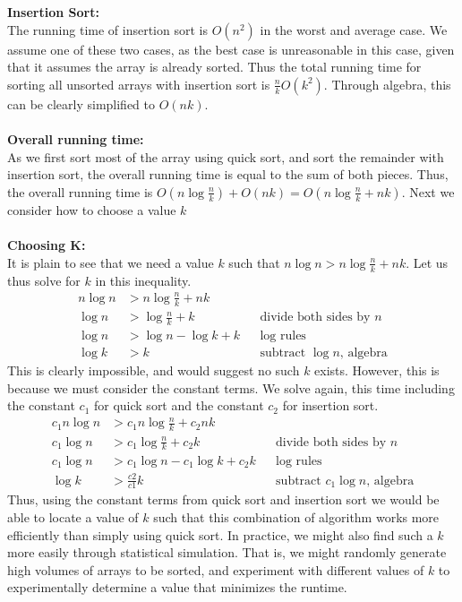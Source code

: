 \documentclass{article}
\begin{document}
\begin{enumerate}
	\\ \\ \textbf{Insertion Sort:}
	\\ The running time of insertion sort is $O(n^2)$ in the worst and average case. We assume one of these two cases, as the best case is unreasonable in this case, given that it assumes the array is already sorted. Thus the total running time for sorting all unsorted arrays with insertion sort is $\frac{n}{k}O(k^2)$. Through algebra, this can be clearly simplified to $O(nk)$.
	\\ \\ \textbf{Overall running time:}
	\\ As we first sort most of the array using quick sort, and sort the remainder with insertion sort, the overall running time is equal to the sum of both pieces. Thus, the overall running time is $O(n\log \frac{n}{k}) + O(nk)= O(n\log \frac{n}{k} + nk)$. Next we consider how to choose a value $k$
	\\ \\ \textbf{Choosing K:}
	\\ It is plain to see that we need a value $k$ such that $ n\log n > n\log \frac{n}{k} + nk$. Let us thus solve for $k$ in this inequality.
	\begin{align}
	n \log n &> n \log \frac{n}{k} + nk  && \text{} \\
	\log n &> \log \frac{n}{k} + k && \text{divide both sides by $n$} \\
	\log n &> \log n - \log k + k && \text{log rules} \\
	\log k &> k && \text{subtract $\log n$, algebra}
	\end{align}
	This is clearly impossible, and would suggest no such $k$ exists. However, this is because we must consider the constant terms. We solve again, this time including the constant $c_1$ for quick sort and the constant $c_2$ for insertion sort.
		\begin{align}
	c_1 n \log n &>c_1 n \log \frac{n}{k} + c_2 nk  && \text{} \\
	c_1 \log n &> c_1 \log \frac{n}{k} + c_2 k && \text{divide both sides by $n$} \\
	c_1 \log n &> c_1 \log n - c_1\log k + c_2 k && \text{log rules} \\
	\log k &> \frac{c2}{c1} k && \text{subtract $c_1 \log n$, algebra}
	\end{align}
	Thus, using the constant terms from quick sort and insertion sort we would be able to locate a value of $k$ such that this combination of algorithm works more efficiently than simply using quick sort. In practice, we might also find such a $k$ more easily through statistical simulation. That is, we might randomly generate high volumes of arrays to be sorted, and experiment with different values of $k$ to experimentally determine a value that minimizes the runtime.
\end{enumerate}
	
\end{document}
